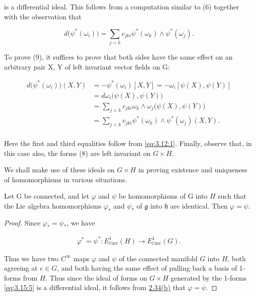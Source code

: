 is a differential ideal. This follows from a computation similar to (6) together with the observation that

\begin{equation}
\tag{9}\label{eq:3.15:9}
d\bigl(\psi^{*}(\omega_{i})\bigr)=\sum_{j<k}c_{j k i}\psi^{*}(\omega_{k})\wedge\psi^{*}(\omega_{j}).
\end{equation}

To prove (9), it suffices to prove that both sides have the same effect on an arbitrary pair X, Y of left invariant vector fields on G:

\begin{equation}
\tag{10}\label{eq:3.15:10}
\begin{aligned}{d\big(\psi^{*}(\omega_{i})\big)(X,Y)}&{{}=-\psi^{*}(\omega_{i})[X,Y]=-\omega_{i}[\psi(X),\psi(Y)]}\\ {}&{{}=d\omega_{i}\big(\psi(X),\psi(Y)\big)}\\ {}&{{}=\sum_{j<k}c_{j k i}\omega_{k}\wedge\omega_{j}\big(\psi(X),\psi(Y)\big)}\\ {}&{{}=\sum_{j<k}c_{j k i}\psi^{*}(\omega_{k})\wedge\psi^{*}(\omega_{j})(X,Y).}\\ \end{aligned}
\end{equation}

Here the first and third equalities follow from \eqref{eq:3.12:1}. Finally, observe that, in this case also, the forms (8) are left invariant on  $ G \times H $.

We shall make use of these ideals on  $ G \times H $ in proving existence and uniqueness of homomorphisms in various situations.

\begin{theorem}\label{thm:3.16}
Let G be connected, and let $\varphi$ and $\psi$ be homomorphisms of G into $H$ such that the Lie algebra homomorphisms $\varphi_{*}$ and $\psi_{*}$ of $\mathfrak{g}$ into $\mathfrak{h}$ are identical. Then $\varphi = \psi$.

\end{theorem}

\begin{proof}
Since  $ \varphi_{*} = \psi_{*} $, we have

\begin{equation}
\tag{1}\label{eq:3.16:1}
\begin{array}{r}{\varphi^{*}=\psi^{*}\colon E_{l\,\mathrm{inv}}^{1}(H)\to E_{l\,\mathrm{inv}}^{1}(G).}\end{array}
\end{equation}

Thus we have two $C^\infty$ maps $\varphi$ and $\psi$ of the connected manifold $G$ into $H$, both agreeing at $e\in G$, and both having the same effect of pulling back a basis of 1-forms from $H$. Thus since the ideal of forms on $G\times H$ generated by the 1-forms \eqref{eq:3.15:5} is a differential ideal, it follows from \hyperref[thm:2.34]{2.34(b)} that $\varphi=\psi$.

\end{proof}

